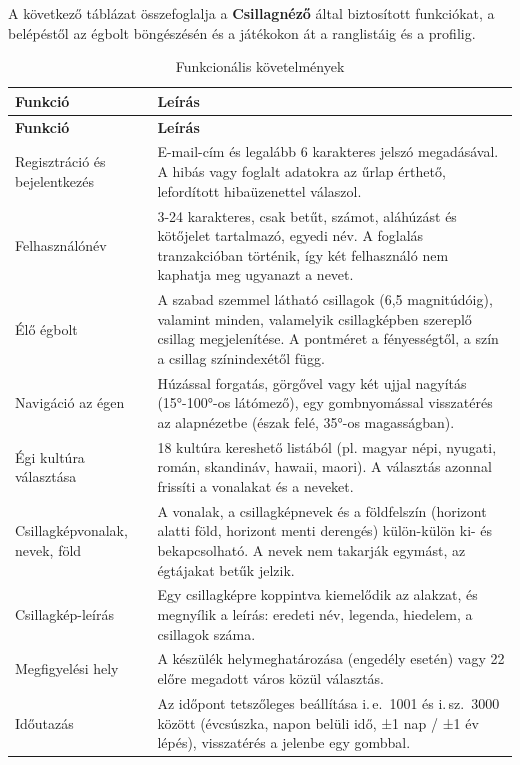 \documentclass[12pt,a4paper]{article}
\newcommand{\fejlec}{\rowcolor{egkekvil}}
\begin{document}
A következő táblázat összefoglalja a \textbf{Csillagnéző} által biztosított funkciókat, a
belépéstől az égbolt böngészésén és a játékokon át a ranglistáig és a profilig.

{\small
\begin{longtable}{|L{4.3cm}|L{10.75cm}|}
  \caption{Funkcionális követelmények}\label{tab:funkc}\\
  \hline
  \fejlec\textbf{Funkció} & \textbf{Leírás} \\ \hline
  \endfirsthead
  \hline
  \fejlec\textbf{Funkció} & \textbf{Leírás} \\ \hline
  \endhead
  Regisztráció és bejelentkezés & E-mail-cím és legalább 6 karakteres jelszó megadásával. A
  hibás vagy foglalt adatokra az űrlap érthető, lefordított hibaüzenettel válaszol. \\ \hline
  Felhasználónév & 3-24 karakteres, csak betűt, számot, aláhúzást és kötőjelet tartalmazó,
  egyedi név. A foglalás tranzakcióban történik, így két felhasználó nem kaphatja meg ugyanazt a
  nevet. \\ \hline
  Élő égbolt & A szabad szemmel látható csillagok (6,5 magnitúdóig), valamint minden, valamelyik
  csillagképben szereplő csillag megjelenítése. A pontméret a fényességtől, a szín a csillag
  színindexétől függ. \\ \hline
  Navigáció az égen & Húzással forgatás, görgővel vagy két ujjal nagyítás (15°-100°-os
  látómező), egy gombnyomással visszatérés az alapnézetbe (észak felé, 35°-os magasságban). \\ \hline
  Égi kultúra választása & 18 kultúra kereshető listából (pl. magyar népi, nyugati, román,
  skandináv, hawaii, maori). A választás azonnal frissíti a vonalakat és a neveket. \\ \hline
  Csillagképvonalak, nevek, föld & A vonalak, a csillagképnevek és a földfelszín (horizont alatti
  föld, horizont menti derengés) külön-külön ki- és bekapcsolható. A nevek nem takarják egymást,
  az égtájakat betűk jelzik. \\ \hline
  Csillagkép-leírás & Egy csillagképre koppintva kiemelődik az alakzat, és megnyílik a leírás:
  eredeti név, legenda, hiedelem, a csillagok száma. \\ \hline
  Megfigyelési hely & A készülék helymeghatározása (engedély esetén) vagy 22 előre megadott város
  közül választás. \\ \hline
  Időutazás & Az időpont tetszőleges beállítása i.\,e.\ 1001 és i.\,sz.\ 3000 között
  (évcsúszka, napon belüli idő, ±1 nap / ±1 év lépés), visszatérés a jelenbe egy gombbal. \\ \hline

\end{longtable}}
\end{document}

